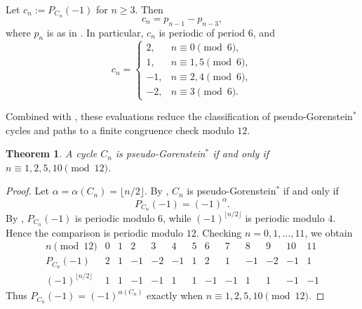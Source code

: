\documentclass[12pt]{amsart}
\theoremstyle{plain}
\newtheorem{thm}{Theorem}[section]
\theoremstyle{definition}
\begin{document}

\begin{lem}\label{lem:cycle-minus-one}
Let \(c_n:=P_{C_n}(-1)\) for \(n\ge 3\). Then
\[
c_n=p_{n-1}-p_{n-3},
\]
where \(p_n\) is as in . In particular, \(c_n\) is
periodic of period \(6\), and
\[
c_n=
\begin{cases}
2,& n\equiv 0 \pmod 6,\\[4pt]
1,& n\equiv 1,5 \pmod 6,\\[4pt]
-1,& n\equiv 2,4 \pmod 6,\\[4pt]
-2,& n\equiv 3 \pmod 6.
\end{cases}
\]
\end{lem}


Combined with , these evaluations reduce the classification of pseudo-Gorenstein\(^{*}\) cycles and paths to a finite congruence check modulo \(12\).

\begin{thm}\label{thm:cycle}
A cycle \(C_n\) is pseudo-Gorenstein$^{*}$ if and only if \(n\equiv 1,2,5,10 \pmod{12}\).
\end{thm}

\begin{proof}
Let \(\alpha=\alpha(C_n)=\lfloor n/2\rfloor\). By ,
\(C_n\) is pseudo-Gorenstein$^{*}$ if and only if
\[
P_{C_n}(-1)=(-1)^{\alpha}.
\]
By , \(P_{C_n}(-1)\) is periodic modulo \(6\), while
\((-1)^{\lfloor n/2\rfloor}\) is periodic modulo \(4\). Hence the comparison is
periodic modulo \(12\). Checking \(n=0,1,\dots,11\), we obtain
\[
\begin{array}{c|cccccccccccc}
n \pmod{12} & 0&1&2&3&4&5&6&7&8&9&10&11\\
\hline
P_{C_n}(-1)
&2&1&-1&-2&-1&1&2&1&-1&-2&-1&1\\
\hline
(-1)^{\lfloor n/2\rfloor}
&1&1&-1&-1&1&1&-1&-1&1&1&-1&-1
\end{array}
\]
Thus \(P_{C_n}(-1)=(-1)^{\alpha(C_n)}\) exactly when \(n\equiv 1,2,5,10 \pmod{12}\).
\end{proof}
\end{document}
